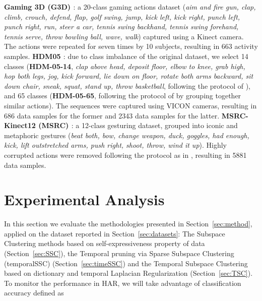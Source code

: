 \documentclass[10pt,a4paper,conference]{IEEEtran}
\begin{document}
\newline
\textbf{Gaming 3D (G3D) \cite{bloom2016hierarchical}}: a 20-class gaming actions dataset (\emph{aim and fire gun, clap, climb, crouch, defend, flap, golf swing, jump, kick left, kick right, punch left, punch right, run, steer a car, tennis swing backhand, tennis swing forehand, tennis serve, throw bowling ball, wave, walk}) captured using a Kinect camera. The actions were repeated for seven times by 10 subjects, resulting in 663 activity samples.
\newline
\textbf{HDM05 \cite{cg-2007-2}}: due to class imbalance of the original dataset, we select 14 classes (\textbf{HDM-05-14}, \emph{clap above head, deposit floor, elbow to knee, grab high, hop both legs, jog, kick forward, lie down on floor, rotate both arms backward, sit down chair, sneak, squat, stand up, throw basketball}, following the protocol of \cite{Wang:ICCV15, Cavazza:ICPR16}), and 65 classes (\textbf{HDM-05-65}, following the protocol of \cite{bellolui} by grouping together similar actions). The sequences were captured using VICON cameras, resulting in 686 data samples for the former and 2343 data samples for the latter.
\newline
\textbf{MSRC-Kinect12 (MSRC) \cite{fothergill2012instructing}}: a 12-class gesturing dataset, grouped into iconic and metaphoric gestures (\emph{beat both, bow, change weapon, duck, goggles, had enough, kick, lift outstretched arms, push right, shoot, throw, wind it up}). Highly corrupted actions were removed following the protocol as in \cite{egizi}, resulting in 5881 data samples.

\section{Experimental Analysis}\label{sec:experiments}

In this section we evaluate the methodologies presented in Section~\ref{sec:method}, applied on the dataset reported in Section~\ref{sec:datasets}:
The Subspace Clustering methods based on self-expressiveness property of data (Section~\ref{sec:SSC}), 
the Temporal pruning via Sparse Subspace Clustering (temporalSSC) (Section~\ref{sec:timeSSC}) and the
Temporal Subspace Clustering based on dictionary and temporal Laplacian Regularization (Section~\ref{sec:TSC}).\\


 To monitor the performance in HAR, we will take advantage of classification accuracy defined as  
\end{document}
